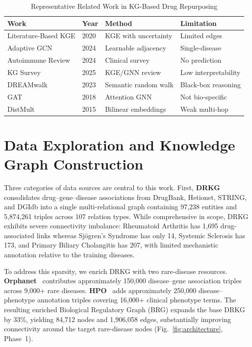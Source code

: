 \documentclass[conference]{IEEEtran}
\begin{document}
\begin{table}[!t]
\caption{Representative Related Work in KG-Based Drug Repurposing}
\centering
\footnotesize
\renewcommand{\arraystretch}{1.4}
\begin{tabular}{p{1.8cm}p{0.5cm}p{2.0cm}p{2.2cm}}
\toprule
\textbf{Work} & \textbf{Year} & \textbf{Method} & \textbf{Limitation} \\
\midrule
Literature-Based KGE & 2020 & KGE with uncertainty & Limited edges \\[2pt]
Adaptive GCN & 2024 & Learnable adjacency & Single-disease \\[2pt]
Autoimmune Review & 2024 & Clinical survey & No prediction \\[2pt]
KG Survey & 2025 & KGE/GNN review & Low interpretability \\[2pt]
DREAMwalk & 2023 & Semantic random walk & Black-box reasoning \\[2pt]
GAT & 2018 & Attention GNN & Not bio-specific \\[2pt]
DistMult & 2015 & Bilinear embeddings & Weak multi-hop \\
\bottomrule
\end{tabular}
\end{table}

\section{Data Exploration and Knowledge Graph Construction}

Three categories of data sources are central to this work. First, \textbf{DRKG}~\cite{drkg} consolidates drug--gene--disease associations from DrugBank, Hetionet, STRING, and DGIdb into a single multi-relational graph containing 97,238 entities and 5,874,261 triples across 107 relation types. While comprehensive in scope, DRKG exhibits severe connectivity imbalance: Rheumatoid Arthritis has 1,695 drug-associated links whereas Sj\"{o}gren's Syndrome has only 14, Systemic Sclerosis has 173, and Primary Biliary Cholangitis has 207, with limited mechanistic annotation relative to the training diseases.

To address this sparsity, we enrich DRKG with two rare-disease resources. \textbf{Orphanet}~\cite{orphanet} contributes approximately 150,000 disease--gene association triples across 9,000+ rare diseases. \textbf{HPO}~\cite{hpo} adds approximately 250,000 disease--phenotype annotation triples covering 16,000+ clinical phenotype terms. The resulting enriched Biological Regulatory Graph (BRG) expands the base DRKG by 33\%, yielding 84,712 nodes and 1,906,058 edges, substantially improving connectivity around the target rare-disease nodes (Fig.~\ref{fig:architecture}, Phase~1).
\end{document}
